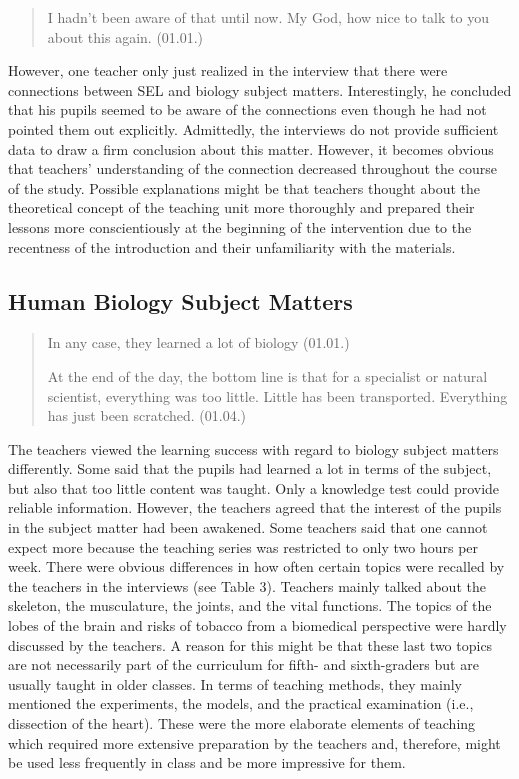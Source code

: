 \documentclass[11.5pt]{sig-alternate} %
\begin{document}
\begin{large}
\begin{quote}
    I hadn’t been aware of that until now. My God, how nice to talk to you about this again. (01.01.)
\end{quote}

However, one teacher only just realized in the interview that there were connections between SEL and biology subject matters. Interestingly, he concluded that his pupils seemed to be aware of the connections even though he had not pointed them out explicitly. Admittedly, the interviews do not provide sufficient data to draw a firm conclusion about this matter. However, it becomes obvious that teachers’ understanding of the connection decreased throughout the course of the study. Possible explanations might be that teachers thought about the theoretical concept of the teaching unit more thoroughly and prepared their lessons more conscientiously at the beginning of the intervention due to the recentness of the introduction and their unfamiliarity with the materials.

\subsection*{Human Biology Subject Matters}

\begin{quote}
    In any case, they learned a lot of biology (01.01.)
    
    At the end of the day, the bottom line is that for a specialist or natural scientist, everything was too little. Little has been transported. Everything has just been scratched. (01.04.)
\end{quote}

The teachers viewed the learning success with regard to biology subject matters differently. Some said that the pupils had learned a lot in terms of the subject, but also that too little content was taught. Only a knowledge test could provide reliable information. However, the teachers agreed that the interest of the pupils in the subject matter had been awakened. Some teachers said that one cannot expect more because the teaching series was restricted to only two hours per week.
There were obvious differences in how often certain topics were recalled by the teachers in the interviews (see Table 3). Teachers mainly talked about the skeleton, the musculature, the joints, and the vital functions. The topics of the lobes of the brain and risks of tobacco from a biomedical perspective were hardly discussed by the teachers. A reason for this might be that these last two topics are not necessarily part of the curriculum for fifth- and sixth-graders but are usually taught in older classes. In terms of teaching methods, they mainly mentioned the experiments, the models, and the practical examination (i.e., dissection of the heart). These were the more elaborate elements of teaching which required more extensive preparation by the teachers and, therefore, might be used less frequently in class and be more impressive for them.


\end{large}
\end{document}
